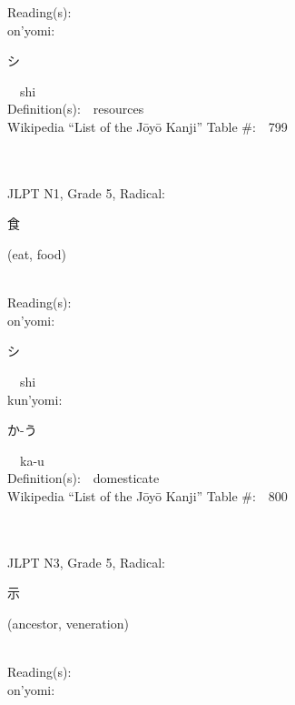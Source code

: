 \begin{multicols}{2}
Reading(s):\ \ \\
{\hspace*{1em}}on'yomi:\ \ \\
{\hspace*{2em}}{\begin{CJK}{UTF8}{min} シ \end{CJK}}\ \ shi\ \ \\
Definition(s):\ \ resources \\
Wikipedia ``List of the J\=oy\=o Kanji'' Table \#:\ \ 799 \\
\ \ \\
{\fontsize{34pt}{40pt}  }\ \ \\  %
{JLPT N1, Grade 5, Radical:\ \ {\begin{CJK}{UTF8}{min} 食 \end{CJK}} (eat, food) } \\
Reading(s):\ \ \\
{\hspace*{1em}}on'yomi:\ \ \\
{\hspace*{2em}}{\begin{CJK}{UTF8}{min} シ \end{CJK}}\ \ shi\ \ \\
{\hspace*{1em}}kun'yomi:\ \ \\
{\hspace*{2em}}{\begin{CJK}{UTF8}{min} か-う \end{CJK}}\ \ ka-u\ \ \\
Definition(s):\ \ domesticate \\
Wikipedia ``List of the J\=oy\=o Kanji'' Table \#:\ \ 800 \\
\ \ \\
{\fontsize{34pt}{40pt}  }\ \ \\  %
{JLPT N3, Grade 5, Radical:\ \ {\begin{CJK}{UTF8}{min} 示 \end{CJK}} (ancestor, veneration) } \\
Reading(s):\ \ \\
{\hspace*{1em}}on'yomi:\ \ \\

\end{multicols}
